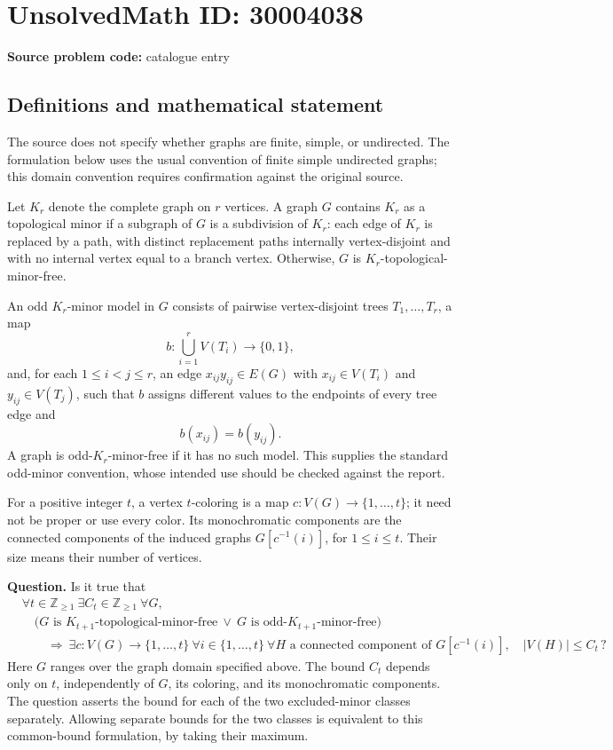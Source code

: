 \documentclass[11pt]{article}
\newcommand{\Z}{\mathbb{Z}}
\begin{document}
\section*{UnsolvedMath ID: 30004038}
\textbf{Source problem code:} catalogue entry
\subsection{Definitions and mathematical statement}
The source does not specify whether graphs are finite, simple, or undirected. The formulation below uses the usual convention of finite simple undirected graphs; this domain convention requires confirmation against the original source.

Let \(K_r\) denote the complete graph on \(r\) vertices. A graph \(G\) contains \(K_r\) as a topological minor if a subgraph of \(G\) is a subdivision of \(K_r\): each edge of \(K_r\) is replaced by a path, with distinct replacement paths internally vertex-disjoint and with no internal vertex equal to a branch vertex. Otherwise, \(G\) is \(K_r\)-topological-minor-free.

An odd \(K_r\)-minor model in \(G\) consists of pairwise vertex-disjoint trees \(T_1,\ldots,T_r\), a map
\[
 b:\bigcup_{i=1}^{r}V(T_i)\longrightarrow\{0,1\},
\]
and, for each \(1\leq i<j\leq r\), an edge \(x_{ij}y_{ij}\in E(G)\) with \(x_{ij}\in V(T_i)\) and \(y_{ij}\in V(T_j)\), such that \(b\) assigns different values to the endpoints of every tree edge and
\[
 b(x_{ij})=b(y_{ij}).
\]
A graph is odd-\(K_r\)-minor-free if it has no such model. This supplies the standard odd-minor convention, whose intended use should be checked against the report.

For a positive integer \(t\), a vertex \(t\)-coloring is a map \(c:V(G)\to\{1,\ldots,t\}\); it need not be proper or use every color. Its monochromatic components are the connected components of the induced graphs \(G[c^{-1}(i)]\), for \(1\leq i\leq t\). Their size means their number of vertices.

\textbf{Question.} Is it true that
\[
\begin{aligned}
&\forall t\in\Z_{\geq1}\ \exists C_t\in\Z_{\geq1}\ \forall G,\\
&\quad\bigl(G\text{ is }K_{t+1}\text{-topological-minor-free}
\ \lor\ G\text{ is odd-}K_{t+1}\text{-minor-free}\bigr)\\
&\qquad\Longrightarrow\ \exists c:V(G)\to\{1,\ldots,t\}\ 
\forall i\in\{1,\ldots,t\}\ 
\forall H\text{ a connected component of }G[c^{-1}(i)],\quad
|V(H)|\leq C_t\,?
\end{aligned}
\]
Here \(G\) ranges over the graph domain specified above. The bound \(C_t\) depends only on \(t\), independently of \(G\), its coloring, and its monochromatic components. The question asserts the bound for each of the two excluded-minor classes separately. Allowing separate bounds for the two classes is equivalent to this common-bound formulation, by taking their maximum.
\end{document}
